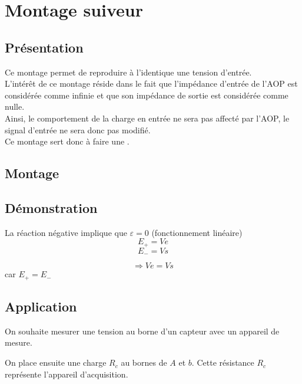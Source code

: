 
\chapter{Montage suiveur }


\section{Présentation}


Ce montage permet de reproduire à l’identique une tension d'entrée. \\
L'intérêt de ce montage réside dans le fait que l’impédance d’entrée de l’AOP est considérée comme infinie et que son impédance de sortie est considérée comme nulle.\\

Ainsi, le comportement de la charge en entrée ne sera pas affecté par l’AOP, le signal d'entrée ne sera donc pas modifié. \\

Ce montage sert donc à faire une .

\section{Montage}



\section{Démonstration} 
La réaction négative implique que $\varepsilon=0$ (fonctionnement linéaire)
$$ E_+=Ve $$
$$ E_-=Vs $$

$$ \Rightarrow Ve=Vs$$ car $E_+=E_-$


\section{Application}

\begin{exemple}
On souhaite mesurer une tension au borne d’un capteur avec un appareil de mesure.


On place ensuite une charge $R_c$ au bornes de $A$ et $b$. Cette résistance $R_c$ représente l'appareil d'acquisition.

\end{exemple}

